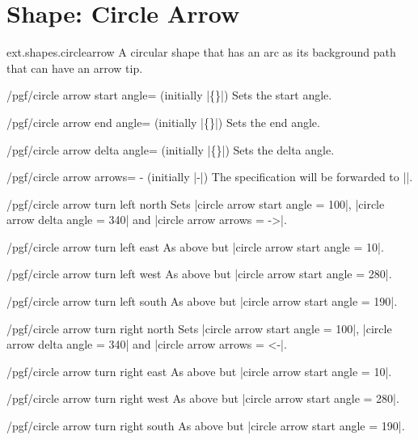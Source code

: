 %
%
%
\section{Shape: Circle Arrow}
\begin{pgflibrary}{ext.shapes.circlearrow}
  A circular shape that has an arc as its background path that can have an arrow tip.
\end{pgflibrary}
\begin{key}{/pgf/circle arrow start angle= (initially |\{\}|)}
Sets the start angle.
\end{key}
\begin{key}{/pgf/circle arrow end angle= (initially |\{\}|)}
Sets the end angle.
\end{key}
\begin{key}{/pgf/circle arrow delta angle= (initially |\{\}|)}
Sets the delta angle.
\end{key}
\begin{key}{/pgf/circle arrow arrows=%
  - (initially |-|)}
The specification will be forwarded to |\pgfsetarrows|\indexCommandO{\pgfsetarrows}.
\end{key}

\begin{key}{/pgf/circle arrow turn left north}
Sets |circle arrow start angle = 100|, |circle arrow delta angle = 340|
and |circle arrow arrows = ->|.
\end{key}
\begin{key}{/pgf/circle arrow turn left east}
As above but |circle arrow start angle = 10|.
\end{key}
\begin{key}{/pgf/circle arrow turn left west}
As above but |circle arrow start angle = 280|.
\end{key}
\begin{key}{/pgf/circle arrow turn left south}
As above but |circle arrow start angle = 190|.
\end{key}
\begin{key}{/pgf/circle arrow turn right north}
Sets |circle arrow start angle = 100|, |circle arrow delta angle = 340|
and |circle arrow arrows = <-|.
\end{key}
\begin{key}{/pgf/circle arrow turn right east}
As above but |circle arrow start angle = 10|.
\end{key}
\begin{key}{/pgf/circle arrow turn right west}
As above but |circle arrow start angle = 280|.
\end{key}
\begin{key}{/pgf/circle arrow turn right south}
As above but |circle arrow start angle = 190|.
\end{key}


